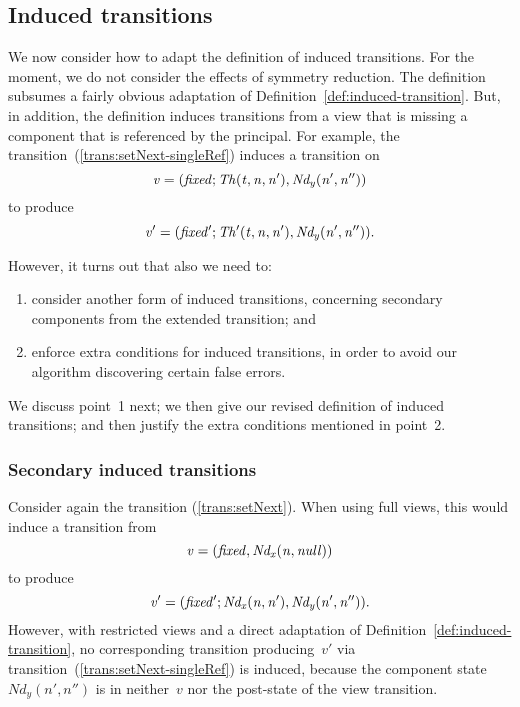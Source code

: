 \subsection{Induced transitions}
\label{sec:singleRef-induced}

We now consider how to adapt the definition of induced transitions.  For the
moment, we do not consider the effects of symmetry reduction.  The definition
subsumes a fairly obvious adaptation of
Definition~\ref{def:induced-transition}.  But, in addition, the definition
induces transitions from a view that is missing a component that is referenced
by the principal.  For example, the transition~(\ref{trans:setNext-singleRef})
induces a transition on
\[\mit
v = (fixed; Th(t, n, n'), Nd_y(n', n''))
\]
to produce
\[\mit
v' = (fixed'; Th'(t, n, n'), Nd_y(n', n'')). 
\]

However, it turns out that also we need to:
%
\begin{enumerate}
\item consider another form of induced transitions, concerning secondary
  components from the extended transition; and

\item enforce extra conditions for induced transitions, in order to avoid our
  algorithm discovering certain false errors.
\end{enumerate}
%
We discuss point~1 next; we then give our revised definition of induced
transitions; and then justify the extra conditions mentioned in point~2.


\subsubsection{Secondary induced transitions}
\label{ssec:c2Refs}


Consider again the transition (\ref{trans:setNext}).  When using full views,
this would induce a transition from 
\[\mit
v = (fixed,  Nd_x(n, null))\]
to produce
\[\mit
v' = (fixed';  Nd_x(n, n'), Nd_y(n', n'')).
\]
However, with restricted views and a direct adaptation of
Definition~\ref{def:induced-transition}, no corresponding transition
producing~$v'$ via transition~(\ref{trans:setNext-singleRef}) is induced,
because the component state $Nd_y(n', n'')$ is in neither~$v$ nor the
post-state of the view transition.

